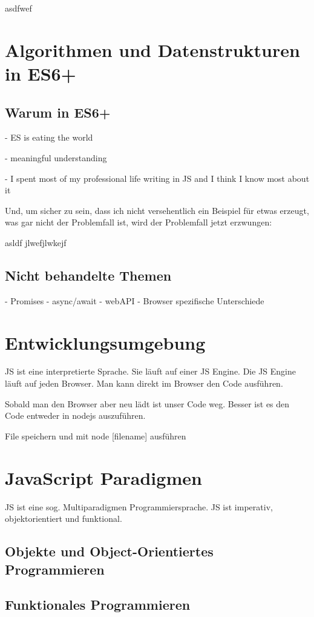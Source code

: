 \documentclass{book}
\begin{document}
\tableofcontents
asdfwef
\chapter{Algorithmen und Datenstrukturen in ES6+}
\section{Warum in ES6+}
- ES is eating the world

- meaningful understanding

- I spent most of my professional life writing in JS and I think I know most about it

Und, um sicher zu sein, dass ich nicht versehentlich ein Beispiel für etwas
erzeugt, was gar nicht der Problemfall ist, wird der Problemfall jetzt
erzwungen:
\clearpage

asldf jlwefjlwkejf 
\section{Nicht behandelte Themen}
- Promises
- async/await
- webAPI
- Browser spezifische Unterschiede

\chapter{Entwicklungsumgebung}
JS ist eine interpretierte Sprache. Sie läuft auf einer JS Engine. Die JS Engine läuft auf jeden Browser. Man kann direkt im Browser den Code ausführen.

Sobald man den Browser aber neu lädt ist unser Code weg. Besser ist es den Code entweder in nodejs auszuführen.

File speichern und mit node [filename] ausführen
\chapter{JavaScript Paradigmen}
JS ist eine sog. Multiparadigmen Programmiersprache. JS ist imperativ, objektorientiert und funktional. 
\section{Objekte und Object-Orientiertes Programmieren}
\section{Funktionales Programmieren}
\end{document}
